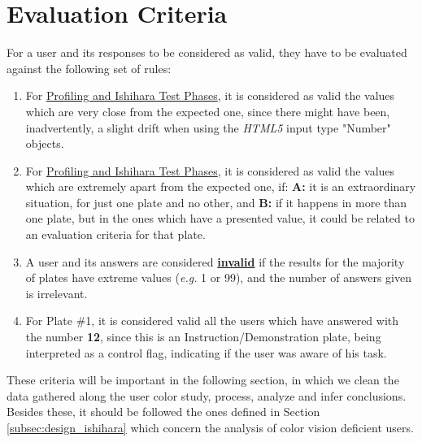 \section{Evaluation Criteria}
\label{sec:impl_evaluationcriteria}
%
For a user and its responses to be considered as valid, they have to be evaluated against the following set of rules:
%
\begin{enumerate}
	\setlength\itemsep{0.01em}
	\item For \ul{Profiling and Ishihara Test Phases}, it is considered as valid the values which are very close from the expected one, since there might
	have been, inadvertently, a slight drift when using the \emph{HTML5} input type "Number" objects.
	\item For \ul{Profiling and Ishihara Test Phases}, it is considered as valid the values which are extremely apart from the expected one, if: \textbf{A:}
	it is an extraordinary situation, for just one plate and no other, and \textbf{B:} if it happens in more than one plate, but in the ones which have a
	presented value, it could be related to an evaluation criteria for that plate.
	\item A user and its answers are considered \textbf{\ul{invalid}} if the results for the majority of plates have extreme values (\emph{e.g.} 1 or 99), and
	the number of answers given is irrelevant.
	\item For Plate \#1, it is considered valid all the users which have answered with the number \textbf{12}, since this is an Instruction/Demonstration plate,
	being interpreted as a control flag, indicating if the user was aware of his task.
\end{enumerate}
%
These criteria will be important in the following section, in which we clean the data gathered along the user color study, process, analyze and infer conclusions.
Besides these, it should be followed the ones defined in Section \ref{subsec:design_ishihara} which concern the analysis of color vision deficient users.
